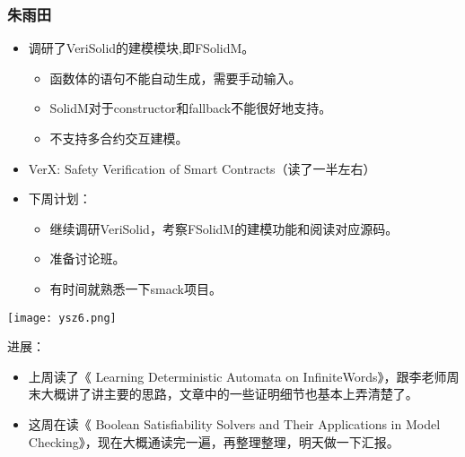 \documentclass[aspectratio=1610, 13pt]{beamer}
\begin{document}
\begin{frame}
  \frametitle{朱雨田}
  \begin{itemize}
      \item 调研了VeriSolid的建模模块,即FSolidM。
      \begin{itemize}
        \item 函数体的语句不能自动生成，需要手动输入。
        \item SolidM对于constructor和fallback不能很好地支持。
        \item 不支持多合约交互建模。
      \end{itemize}
      \item VerX: Safety Verification of Smart Contracts（读了一半左右）
      \item 下周计划：
      \begin{itemize}
        \item 继续调研VeriSolid，考察FSolidM的建模功能和阅读对应源码。
        \item 准备讨论班。
        \item 有时间就熟悉一下smack项目。
      \end{itemize}
  \end{itemize}
\end{frame}

\begin{frame}{\texttt{[image: ysz6.png]}}


进展：
    \begin{itemize}
        \item 上周读了《 Learning Deterministic Automata on InfiniteWords》，跟李老师周末大概讲了讲主要的思路，文章中的一些证明细节也基本上弄清楚了。 
        \item 这周在读《 Boolean Satisfiability Solvers and Their Applications in Model Checking》，现在大概通读完一遍，再整理整理，明天做一下汇报。
\end{itemize}    
\end{frame}
\end{document}
